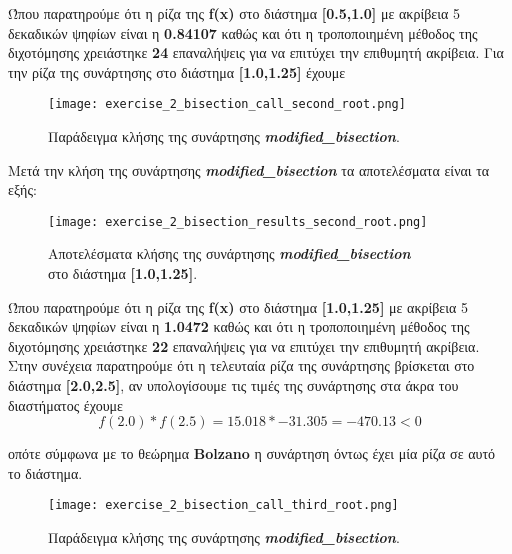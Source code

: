 \documentclass[First Project.tex]{subfiles}
\begin{document}
Ώπου παρατηρούμε ότι η ρίζα της \textlatin{\textbf{f(x)}} στο διάστημα \textbf{[0.5,1.0]} με ακρίβεια 5 δεκαδικών ψηφίων 
είναι η \textbf{0.84107} καθώς και ότι η τροποποιημένη μέθοδος της διχοτόμησης χρειάστηκε \textbf{24} επαναλήψεις για να επιτύχει την 
επιθυμητή ακρίβεια. Για την ρίζα της συνάρτησης στο διάστημα \textbf{[1.0,1.25]} έχουμε 
\vspace{5px}
\begin{figure}[h!]
    \centering
    \captionsetup{justification=centering}
    \begin{center}
        \texttt{[image: exercise\_2\_bisection\_call\_second\_root.png]}    
        \caption{Παράδειγμα κλήσης της συνάρτησης \textit{\textlatin{\textbf{modified\_bisection}}}.}
    \end{center}
\end{figure}


Μετά την κλήση της συνάρτησης \textit{\textlatin{\textbf{modified\_bisection}}} τα αποτελέσματα είναι τα εξής:
\vspace{5px}
\begin{figure}[h!]
    \centering
    \captionsetup{justification=centering}
    \begin{center}
    \texttt{[image: exercise\_2\_bisection\_results\_second\_root.png]}    
    \caption{ Αποτελέσματα κλήσης της συνάρτησης \textit{\textlatin{\textbf{modified\_bisection}}} \\ στο διάστημα \textbf{[1.0,1.25]}.}
    \end{center}
\end{figure}

Ώπου παρατηρούμε ότι η ρίζα της \textlatin{\textbf{f(x)}} στο διάστημα \textbf{[1.0,1.25]} με ακρίβεια 5 δεκαδικών ψηφίων 
είναι η \textbf{1.0472} καθώς και ότι η τροποποιημένη μέθοδος της διχοτόμησης χρειάστηκε \textbf{22} επαναλήψεις για να επιτύχει την 
επιθυμητή ακρίβεια. Στην συνέχεια παρατηρούμε ότι η τελευταία ρίζα της συνάρτησης βρίσκεται στο διάστημα \textbf{[2.0,2.5]}, αν υπολογίσουμε
τις τιμές της συνάρτησης στα άκρα του διαστήματος έχουμε 
\begin{equation*}
    f(2.0) * f(2.5) = 15.018 * -31.305 = -470.13 < 0
\end{equation*} 

οπότε σύμφωνα με το θεώρημα \textlatin{\textbf{Bolzano}} η συνάρτηση όντως έχει μία ρίζα σε αυτό το διάστημα.
\vspace{5px}
\begin{figure}[h!]
    \centering
    \captionsetup{justification=centering}
    \begin{center}
        \texttt{[image: exercise\_2\_bisection\_call\_third\_root.png]}    
        \caption{Παράδειγμα κλήσης της συνάρτησης \textit{\textlatin{\textbf{modified\_bisection}}}.}
    \end{center}
\end{figure}
\end{document}
